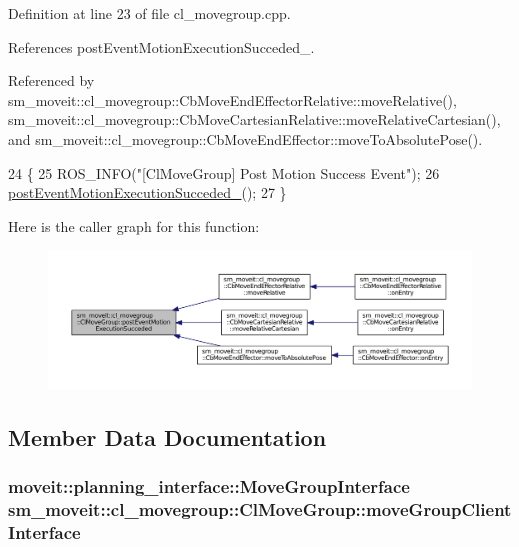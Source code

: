 Definition at line 23 of file cl\+\_\+movegroup.\+cpp.



References post\+Event\+Motion\+Execution\+Succeded\+\_\+.



Referenced by sm\+\_\+moveit\+::cl\+\_\+movegroup\+::\+Cb\+Move\+End\+Effector\+Relative\+::move\+Relative(), sm\+\_\+moveit\+::cl\+\_\+movegroup\+::\+Cb\+Move\+Cartesian\+Relative\+::move\+Relative\+Cartesian(), and sm\+\_\+moveit\+::cl\+\_\+movegroup\+::\+Cb\+Move\+End\+Effector\+::move\+To\+Absolute\+Pose().


\begin{DoxyCode}
24 \{
25     ROS\_INFO(\textcolor{stringliteral}{"[ClMoveGroup] Post Motion Success Event"});
26     \hyperlink{classsm__moveit_1_1cl__movegroup_1_1ClMoveGroup_aad5217efd0061eb0c6dd70550a53bdd2}{postEventMotionExecutionSucceded\_}();
27 \}
\end{DoxyCode}


Here is the caller graph for this function\+:
\nopagebreak
\begin{figure}[H]
\begin{center}
\leavevmode
\includegraphics[width=350pt]{classsm__moveit_1_1cl__movegroup_1_1ClMoveGroup_ab4585dcd850286ed168a25a3ddd56eed_icgraph}
\end{center}
\end{figure}




\subsection{Member Data Documentation}
\subsubsection[{\texorpdfstring{move\+Group\+Client\+Interface}{moveGroupClientInterface}}]{\setlength{\rightskip}{0pt plus 5cm}moveit\+::planning\+\_\+interface\+::\+Move\+Group\+Interface sm\+\_\+moveit\+::cl\+\_\+movegroup\+::\+Cl\+Move\+Group\+::move\+Group\+Client\+Interface}\hypertarget{classsm__moveit_1_1cl__movegroup_1_1ClMoveGroup_a23acf6883455566dbab30e4367c2144d}{}\label{classsm__moveit_1_1cl__movegroup_1_1ClMoveGroup_a23acf6883455566dbab30e4367c2144d}


